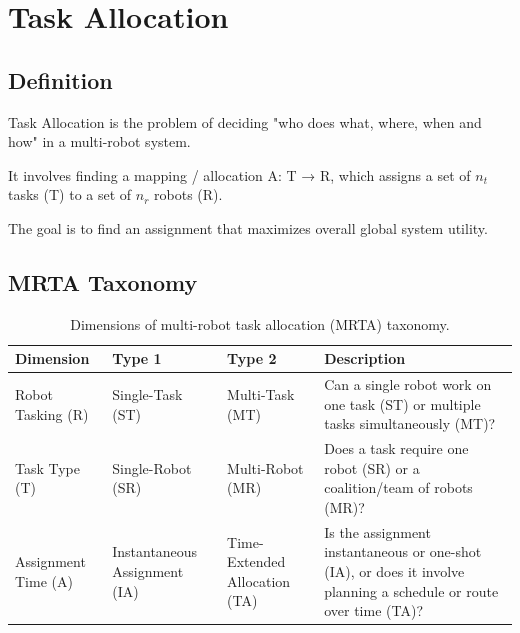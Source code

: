 \chapter*{Task Allocation}

\vspace{-0.5cm}

\section*{Definition}

Task Allocation is the problem of deciding "who does what, where, when and how" in a multi-robot system.

It involves finding a mapping / allocation A: T → R, which assigns a set of $n_t$ tasks (T) to a set of $n_r$ robots (R).

The goal is to find an assignment that maximizes overall global system utility.

\section*{MRTA Taxonomy}

\begin{table}[h!]
\centering
\renewcommand{\arraystretch}{1.2}
\begin{tabularx}{\textwidth}{@{}>{\centering\arraybackslash}p{3cm}|
                                  >{\centering\arraybackslash}p{2.5cm}|
                                  >{\centering\arraybackslash}p{2.5cm}|
                                  X@{}}
\toprule
\textbf{Dimension} & \textbf{Type 1} & \textbf{Type 2} & \textbf{Description} \\ \midrule
Robot Tasking (R) & Single-Task (ST) & Multi-Task (MT) & Can a single robot work on one task (ST) or multiple tasks simultaneously (MT)? \\ \addlinespace
Task Type (T) & Single-Robot (SR) & Multi-Robot (MR) & Does a task require one robot (SR) or a coalition/team of robots (MR)? \\ \addlinespace
Assignment Time (A) & Instantaneous Assignment (IA) & Time-Extended Allocation (TA) & Is the assignment instantaneous or one-shot (IA), or does it involve planning a schedule or route over time (TA)? \\
\bottomrule
\end{tabularx}
\caption{Dimensions of multi-robot task allocation (MRTA) taxonomy.}
\label{tab:mrta-dimensions}
\end{table}

